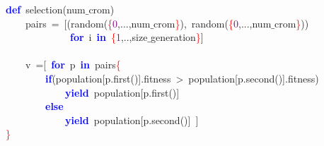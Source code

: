 \noindent
\mbox{}\textbf{\textcolor{Blue}{def}}\ selection\textcolor{BrickRed}{(}num$\_$crom\textcolor{BrickRed}{)} \\
\mbox{}\ \ \ \ pairs\ \textcolor{BrickRed}{=}\ \textcolor{BrickRed}{[(}random\textcolor{BrickRed}{(}\textcolor{Red}{\{}\textcolor{Purple}{0}\textcolor{BrickRed}{,...,}num$\_$crom\textcolor{Red}{\}}\textcolor{BrickRed}{),}\ random\textcolor{BrickRed}{(}\textcolor{Red}{\{}\textcolor{Purple}{0}\textcolor{BrickRed}{,...,}num$\_$crom\textcolor{Red}{\}}\textcolor{BrickRed}{))} \\
\mbox{}\ \ \ \ \ \ \ \ \ \ \ \ \ \textbf{\textcolor{Blue}{for}}\ i\ \textbf{\textcolor{Blue}{in}}\ \textcolor{Red}{\{}\textcolor{Purple}{1}\textcolor{BrickRed}{,..,}size$\_$generation\textcolor{Red}{\}}\textcolor{BrickRed}{]} \\
\mbox{} \\
\mbox{}\ \ \ \ v\ \textcolor{BrickRed}{=[}\ \textbf{\textcolor{Blue}{for}}\ p\ \textbf{\textcolor{Blue}{in}}\ pairs\textcolor{Red}{\{} \\
\mbox{}\ \ \ \ \ \ \ \ \textbf{\textcolor{Blue}{if}}\textcolor{BrickRed}{(}population\textcolor{BrickRed}{[}p\textcolor{BrickRed}{.}first\textcolor{BrickRed}{()].}fitness\ \textcolor{BrickRed}{\textgreater{}}\ population\textcolor{BrickRed}{[}p\textcolor{BrickRed}{.}second\textcolor{BrickRed}{()].}fitness\textcolor{BrickRed}{)} \\
\mbox{}\ \ \ \ \ \ \ \ \ \ \ \ \textbf{\textcolor{Blue}{yield}}\ population\textcolor{BrickRed}{[}p\textcolor{BrickRed}{.}first\textcolor{BrickRed}{()]} \\
\mbox{}\ \ \ \ \ \ \ \ \textbf{\textcolor{Blue}{else}} \\
\mbox{}\ \ \ \ \ \ \ \ \ \ \ \ \textbf{\textcolor{Blue}{yield}}\ population\textcolor{BrickRed}{[}p\textcolor{BrickRed}{.}second\textcolor{BrickRed}{()]}\ \textcolor{BrickRed}{]} \\
\mbox{}\textcolor{Red}{\}} \\
\mbox{}
